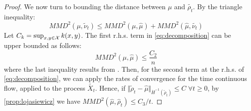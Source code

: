 \begin{proof}
	
	We now turn to bounding the distance between $\mu$ and $\widetilde{\rho_t}$. By the triangle inequality:
	\begin{equation}\label{eq:decomposition}
	MMD^2(\mu, \widetilde{\nu}_t)\le MMD^2(\mu, \widehat{\mu})+MMD^2(\widehat{\mu}, \widetilde{\nu_t})%
	\end{equation}
	Let $C_k=\sup_{x,y \in {{\mathcal X}}}k(x,y)$. The first r.h.s. term in \eqref{eq:decomposition} can be upper bounded as follows:
	\begin{equation}
	MMD^2( \mu,\widehat{\mu})\le \frac{C_2}{n}
	\end{equation}
	where the last inequality results from \cite{tolstikhin2017minimax}.
	Then, for the second term at the r.h.s. of  \eqref{eq:decomposition}, we can apply the rates of convergence for the time continuous flow, applied to the process $\widetilde{X_t}$. Hence, if $\Vert \widetilde{\rho}_t  - \widehat{\mu} \Vert_{\dot{H}^{-1}(\widetilde{\rho}_t)} \leq C \; \forall t\geq 0$, by \cref{prop:lojasiewicz} we have $MMD^2(\widehat{ \mu},\widehat{\rho}_t)\le C_3/t$. 
\end{proof}